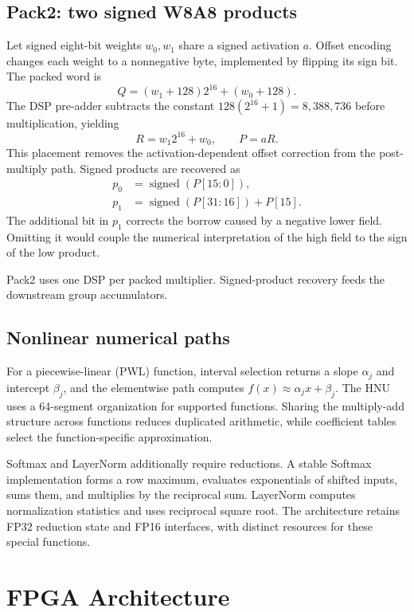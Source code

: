 \documentclass[journal,10pt]{IEEEtran}
\begin{document}
\subsection{Pack2: two signed W8A8 products}
Let signed eight-bit weights $w_0,w_1$ share a signed activation $a$. Offset encoding changes each weight to a nonnegative byte, implemented by flipping its sign bit. The packed word is
\begin{equation}
Q=(w_1+128)2^{16}+(w_0+128).
\end{equation}
The DSP pre-adder subtracts the constant $128(2^{16}+1)=8{,}388{,}736$ before multiplication, yielding
\begin{equation}
R=w_1 2^{16}+w_0,\qquad P=aR.
\end{equation}
This placement removes the activation-dependent offset correction from the post-multiply path. Signed products are recovered as
\begin{align}
p_0&=\operatorname{signed}(P[15:0]),\\
p_1&=\operatorname{signed}(P[31:16])+P[15].
\end{align}
The additional bit in $p_1$ corrects the borrow caused by a negative lower field. Omitting it would couple the numerical interpretation of the high field to the sign of the low product.

Pack2 uses one DSP per packed multiplier. Signed-product recovery feeds the downstream group accumulators.

\subsection{Nonlinear numerical paths}
For a piecewise-linear (PWL) function, interval selection returns a slope $\alpha_j$ and intercept $\beta_j$, and the elementwise path computes $f(x)\approx\alpha_jx+\beta_j$. The HNU uses a 64-segment organization for supported functions. Sharing the multiply-add structure across functions reduces duplicated arithmetic, while coefficient tables select the function-specific approximation.

Softmax and LayerNorm additionally require reductions. A stable Softmax implementation forms a row maximum, evaluates exponentials of shifted inputs, sums them, and multiplies by the reciprocal sum. LayerNorm computes normalization statistics and uses reciprocal square root. The architecture retains FP32 reduction state and FP16 interfaces, with distinct resources for these special functions.

\section{FPGA Architecture}\label{sec:architecture}
\end{document}
